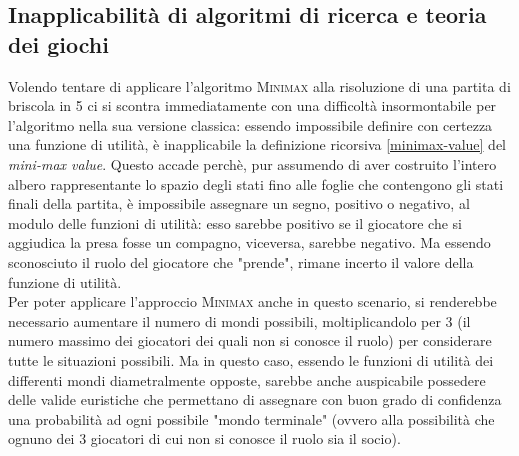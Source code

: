 \subsection{Inapplicabilità di algoritmi di ricerca e teoria dei giochi}
Volendo tentare di applicare l'algoritmo \textsc{Minimax} alla risoluzione di una partita di briscola in 5 ci si scontra immediatamente con una difficoltà insormontabile per l'algoritmo nella sua versione classica: essendo impossibile definire con certezza una funzione di utilità, è inapplicabile la definizione ricorsiva \ref{minimax-value} del \emph{mini-max value}.
Questo accade perchè, pur assumendo di aver costruito l'intero albero rappresentante lo spazio degli stati fino alle foglie che contengono gli stati finali della partita, è impossibile assegnare un segno, positivo o negativo, al modulo delle funzioni di utilità: esso sarebbe positivo se il giocatore che si aggiudica la presa fosse un compagno, viceversa, sarebbe negativo.
Ma essendo sconosciuto il ruolo del giocatore che "prende", rimane incerto il valore della funzione di utilità.\\
Per poter applicare l'approccio \textsc{Minimax} anche in questo scenario, si renderebbe necessario aumentare il numero di mondi possibili, moltiplicandolo per 3 (il numero massimo dei giocatori dei quali non si conosce il ruolo) per considerare tutte le situazioni possibili.
Ma in questo caso, essendo le funzioni di utilità dei differenti mondi diametralmente opposte, sarebbe anche auspicabile possedere delle valide euristiche che permettano di assegnare con buon grado di confidenza una probabilità ad ogni possibile "mondo terminale" (ovvero alla possibilità che ognuno dei 3 giocatori di cui non si conosce il ruolo sia il socio).

